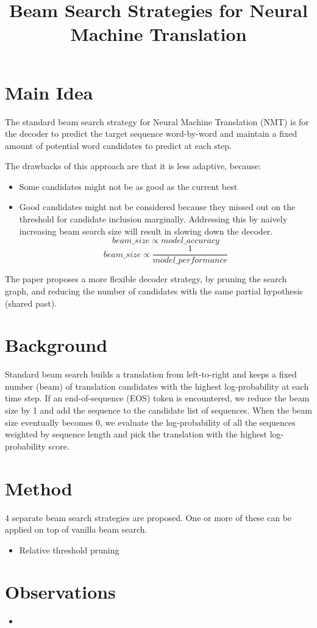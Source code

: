\documentclass[12pt]{scrartcl}
\begin{document}
\title{Beam Search Strategies for Neural Machine Translation}
\author{}
\date{}
\maketitle

\section{Main Idea}
  The standard beam search strategy for Neural Machine Translation (NMT) is for the decoder to predict the target sequence word-by-word and maintain a fixed amount of potential word candidates to predict at each step. 
  
  The drawbacks of this approach are that it is less adaptive, because: 
  \begin{itemize}
    \item Some candidates might not be as good as the current best
    \item Good candidates might not be considered because they missed out on the threshold for candidate inclusion marginally. Addressing this by naively increasing beam search size will result in slowing down the decoder.
    $$beam\_size \propto model\_accuracy$$
    $$beam\_size \propto \frac{1}{model\_performance}$$
  \end{itemize}

  The paper proposes a more flexible decoder strategy, by pruning the search graph, and reducing the number of candidates with the same partial hypothesis (shared past).

\section{Background}
  Standard beam search builds a translation from left-to-right and keeps a fixed
  number (beam) of translation candidates with the highest log-probability at each time step. If an end-of-sequence (EOS) token is encountered, we reduce the beam size by 1 and add the sequence to the candidate list of sequences. When the beam size eventually becomes 0, we evaluate the log-probability of all the sequences weighted by sequence length and pick the translation with the highest log-probability score.

\section{Method}
  4 separate beam search strategies are proposed. One or more of these can be applied on top of vanilla beam search.
  \begin{itemize}
    \item Relative threshold pruning
  \end{itemize}

\section{Observations}
  \begin{itemize}
    \item 
  \end{itemize}



\end{document}
